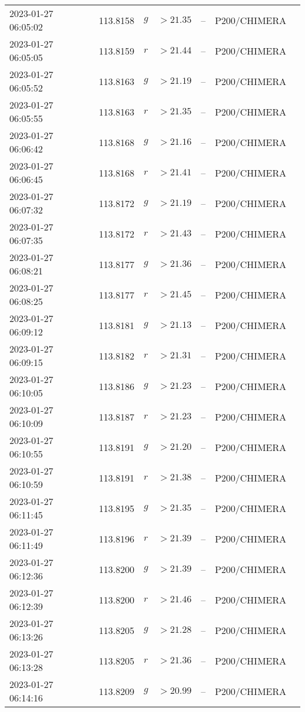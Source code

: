 \documentclass{nature_plusfigure}
\begin{document}
\begin{supplement}
\begin{center}
\begin{longtable}{lllllll}
2023-01-27 06:05:02 & 113.8158 & $g$ & $>21.35$ & -- & P200/CHIMERA &  \\ 
2023-01-27 06:05:05 & 113.8159 & $r$ & $>21.44$ & -- & P200/CHIMERA &  \\ 
2023-01-27 06:05:52 & 113.8163 & $g$ & $>21.19$ & -- & P200/CHIMERA &  \\ 
2023-01-27 06:05:55 & 113.8163 & $r$ & $>21.35$ & -- & P200/CHIMERA &  \\ 
2023-01-27 06:06:42 & 113.8168 & $g$ & $>21.16$ & -- & P200/CHIMERA &  \\ 
2023-01-27 06:06:45 & 113.8168 & $r$ & $>21.41$ & -- & P200/CHIMERA &  \\ 
2023-01-27 06:07:32 & 113.8172 & $g$ & $>21.19$ & -- & P200/CHIMERA &  \\ 
2023-01-27 06:07:35 & 113.8172 & $r$ & $>21.43$ & -- & P200/CHIMERA &  \\ 
2023-01-27 06:08:21 & 113.8177 & $g$ & $>21.36$ & -- & P200/CHIMERA &  \\ 
2023-01-27 06:08:25 & 113.8177 & $r$ & $>21.45$ & -- & P200/CHIMERA &  \\ 
2023-01-27 06:09:12 & 113.8181 & $g$ & $>21.13$ & -- & P200/CHIMERA &  \\ 
2023-01-27 06:09:15 & 113.8182 & $r$ & $>21.31$ & -- & P200/CHIMERA &  \\ 
2023-01-27 06:10:05 & 113.8186 & $g$ & $>21.23$ & -- & P200/CHIMERA &  \\ 
2023-01-27 06:10:09 & 113.8187 & $r$ & $>21.23$ & -- & P200/CHIMERA &  \\ 
2023-01-27 06:10:55 & 113.8191 & $g$ & $>21.20$ & -- & P200/CHIMERA &  \\ 
2023-01-27 06:10:59 & 113.8191 & $r$ & $>21.38$ & -- & P200/CHIMERA &  \\ 
2023-01-27 06:11:45 & 113.8195 & $g$ & $>21.35$ & -- & P200/CHIMERA &  \\ 
2023-01-27 06:11:49 & 113.8196 & $r$ & $>21.39$ & -- & P200/CHIMERA &  \\ 
2023-01-27 06:12:36 & 113.8200 & $g$ & $>21.39$ & -- & P200/CHIMERA &  \\ 
2023-01-27 06:12:39 & 113.8200 & $r$ & $>21.46$ & -- & P200/CHIMERA &  \\ 
2023-01-27 06:13:26 & 113.8205 & $g$ & $>21.28$ & -- & P200/CHIMERA &  \\ 
2023-01-27 06:13:28 & 113.8205 & $r$ & $>21.36$ & -- & P200/CHIMERA &  \\ 
2023-01-27 06:14:16 & 113.8209 & $g$ & $>20.99$ & -- & P200/CHIMERA &  \\ 

\end{longtable}
\end{center}
\end{supplement}
\end{document}
